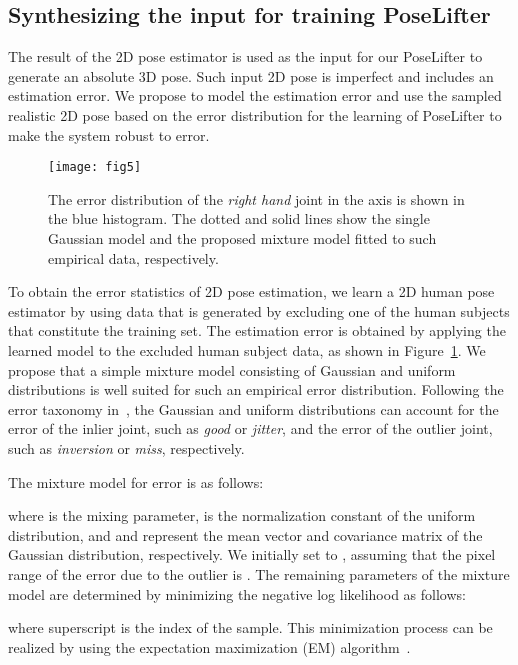 \documentclass[10pt,twocolumn,letterpaper]{article}
\begin{document}
\subsection{Synthesizing the input for training PoseLifter}
\label{sec4.2}

The result of the 2D pose estimator is used as the input for our PoseLifter to generate an absolute 3D pose. Such input 2D pose is imperfect and includes an estimation error. We propose to model the estimation error and use the sampled realistic 2D pose based on the error distribution for the learning of PoseLifter to make the system robust to error.

\begin{figure}
\centering
\texttt{[image: fig5]}
\caption{The error distribution of the \textit{right hand} joint in the  axis is shown in the blue histogram. The dotted and solid lines show the single Gaussian model and the proposed mixture model fitted to such empirical data, respectively.}
\label{fig5}
\end{figure}

To obtain the error statistics of 2D pose estimation, we learn a 2D human pose estimator by using data that is generated by excluding one of the human subjects that constitute the training set. The estimation error is obtained by applying the learned model to the excluded human subject data, as shown in Figure~\ref{fig5}. We propose that a simple mixture model consisting of Gaussian and uniform distributions is well suited for such an empirical error distribution. Following the error taxonomy in~\cite{Ronchi2017}, the Gaussian and uniform distributions can account for the error of the inlier joint, such as \textit{good} or \textit{jitter}, and the error of the outlier joint, such as \textit{inversion} or \textit{miss}, respectively.

The mixture model for error  is as follows:

where  is the mixing parameter,  is the normalization constant of the uniform distribution, and  and  represent the mean vector and covariance matrix of the Gaussian distribution, respectively. We initially set  to , assuming that the pixel range of the error due to the outlier is . The remaining parameters of the mixture model are determined by minimizing the negative log likelihood as follows:

where superscript  is the index of the sample. This minimization process can be realized by using the expectation maximization (EM) algorithm~\cite{Dempster1977}.
\end{document}
